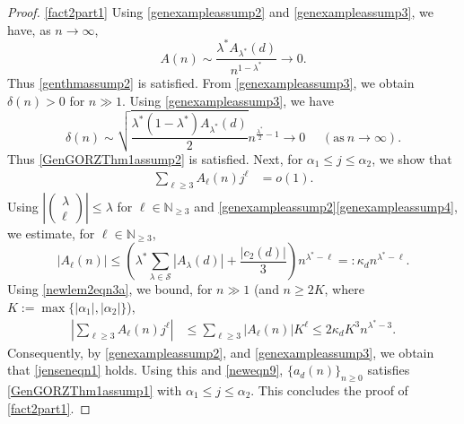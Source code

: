 \documentclass[10pt,a4paper]{amsart}
\renewcommand{\a}{\alpha}
\renewcommand{\d}{{\delta}}
\renewcommand{\k}{\kappa}
\renewcommand{\l}{\lambda}
\newcommand{\smallbinom}[2]{(\begin{smallmatrix}#1\\#2\end{smallmatrix})}
\begin{document}
\begin{proof}
\noindent \ref{fact2part1} Using \ref{genexampleassump2} and \ref{genexampleassump3}, we have, as $n\to \infty$,  
\begin{equation}\label{obs4}
A(n)\sim \frac{\l^*A_{\l^*}(d)}{n^{1-\l^*}}\to 0.
\end{equation}
Thus \ref{genthmassump2} is satisfied. From \ref{genexampleassump3}, we obtain $\d(n)>0$ for $n\!\gg\!1$. Using \ref{genexampleassump3}, we have 
\begin{equation}\label{impfact}
\d(n)\sim \sqrt{\frac{\l^*(1-\l^*)A_{\l^*}(d)}{2}}n^{\frac{\l^*}{2}-1}\to 0\ \ \ \ \ \ (\text{as}\ n\to \infty). %
\end{equation}
 Thus \ref{GenGORZThm1assump2} is satisfied. Next, for  $\a_1\le j\le \a_2$, we show that
\begin{align}%
\label{jenseneqn1}
\sum_{\ell\ge 3}A_{\ell}(n)j^\ell&=o\left(1\right).%
\end{align}
Using $|\smallbinom{\l}{\ell}|\le \l$ for $\ell\in \mathbb{N}_{\ge 3}$ and \ref{genexampleassump2}\textendash\ref{genexampleassump4}, we estimate, for $\ell\in\mathbb{N}_{\ge 3}$, 
\begin{equation}\label{newlem2eqn3a}
|A_{\ell}(n)| \le \left(\l^*\sum_{\l\in \mathcal{S}} |A_{\l}(d)|+\frac{\left|c_2(d)\right|}{3}\right)n^{\l^*-\ell}=:\k_d n^{\l^*-\ell}.
\end{equation}
 Using \eqref{newlem2eqn3a}, we bound, for $n\!\gg\!1$ (and $n\ge 2K$, where $K:=\max\{|\a_1|, |\a_2|\}$), 
\begin{align*}
\left|\sum_{\ell\ge 3}A_{\ell}(n)j^\ell\right|&\le \sum_{\ell\ge 3}\left|A_{\ell}(n)\right|K^\ell
\le 2\k_{d}K^{3}n^{\l^*-3}.
\end{align*}
 Consequently, by \ref{genexampleassump2}, and \ref{genexampleassump3}, we obtain that \eqref{jenseneqn1} holds. Using this and \eqref{neweqn9}, $\{a_d(n)\}_{n\ge 0}$ satisfies \ref{GenGORZThm1assump1} with $\a_1\le j\le \a_2$. This concludes the proof of \ref{fact2part1}. 


\end{proof}
\end{document}
